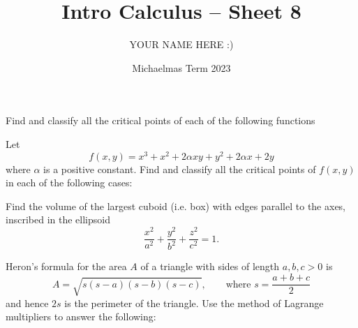 \documentclass[answers]{exam}
\title{Intro Calculus -- Sheet 8}
\author{YOUR NAME HERE :)}
\date{Michaelmas Term 2023}
\begin{document}
\maketitle
\begin{questions}

\question%
Find and classify all the critical points of each of the following functions



\question%
Let \[
	f(x, y)=x^{3}+x^{2}+2 \alpha x y+y^{2}+2\alpha x+2 y
\] where $\alpha$ is a positive constant. Find and classify all the critical points of $f(x, y)$ in each of the following cases:



\question%
Find the volume of the largest cuboid (i.e. box) with edges parallel to the axes, inscribed in the ellipsoid \[
	\frac{x^{2}}{a^{2}}+\frac{y^{2}}{b^{2}}+\frac{z^{2}}{c^{2}}=1.
\]



\question%
Heron's formula for the area $A$ of a triangle with sides of length $a, b, c>0$ is \[
A=\sqrt{s(s-a)(s-b)(s-c)}, \qquad\text{where }s=\frac{a+b+c}{2}
\] and hence $2s$ is the perimeter of the triangle. Use the method of Lagrange multipliers to answer the following:
\begin{parts}

\end{parts}
\end{questions}
\end{document}
